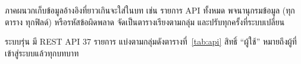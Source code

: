 \label{app:api}

\begin{guide}
ภาคผนวกเก็บข้อมูลอ้างอิงที่ยาวเกินจะใส่ในบท เช่น รายการ API ทั้งหมด พจนานุกรมข้อมูล (ทุกตาราง ทุกฟิลด์)
หรือรหัสข้อผิดพลาด จัดเป็นตารางเรียงตามกลุ่ม และปรับทุกครั้งที่ระบบเปลี่ยน
\end{guide}

ระบบรุ่น \systemversion{} มี REST API 37 รายการ แบ่งตามกลุ่มดังตารางที่~\ref{tab:api}
สิทธิ์ ``ผู้ใช้'' หมายถึงผู้ที่เข้าสู่ระบบแล้วทุกบทบาท


